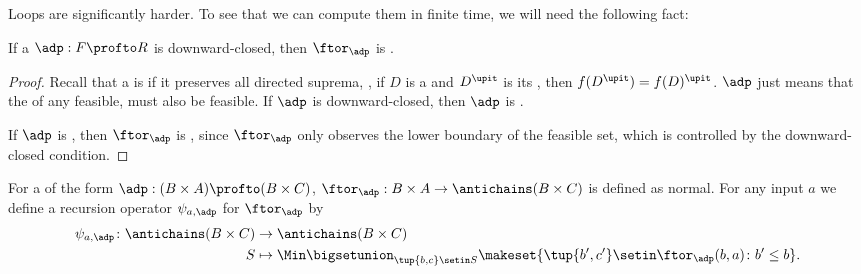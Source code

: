 Loops are significantly harder.
To see that we can compute them in finite time, we will need the following fact:
\begin{lemma}\label{lem:downward-closed-dp}
    If a  $\adp : F \profto R$ is downward-closed, then $\ftor_\adp$ is .
\end{lemma}

\begin{proof}
    Recall that a  is  if it preserves all directed suprema, \ie, if $D$ is a  and $D^{\upit}$ is its , then $f(D^{\upit}) = f(D)^{\upit}$.
    $\adp$  just means that the  of any feasible,  must also be feasible.
    If $\adp$ is downward-closed, then $\adp$ is .


    If $\adp$ is , then $\ftor_\adp$ is , since $\ftor_\adp$ only observes the lower boundary of the feasible set, which is controlled by the downward-closed condition.
\end{proof}

For a  of the form $\adp : (B \times A) \profto (B \times C)$, $\ftor_\adp : B \times A \to \antichains (B \times C)$ is defined as normal.
For any input $a$ we define a recursion operator $\psi_{a,\adp}$ for $\ftor_\adp$ by
\begin{equation}
    \begin{aligned}
        \psi_{a,\adp} \colon \antichains (B \times C) & \to \antichains (B \times C) \\
        S                                             & \mapsto \Min \bigsetunion_{\tup{b,c} \setin S} \makeset{ \tup{b',c'} \setin \ftor_\adp(b,a) \colon b' \leq b }.
    \end{aligned}
\end{equation}

